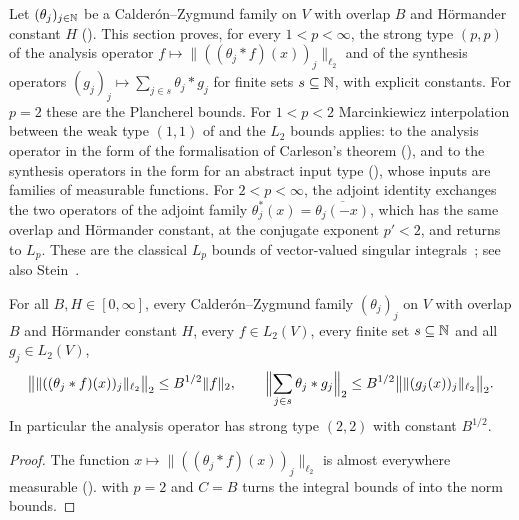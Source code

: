 Let $(\theta_j)_{j \in \mathbb{N}}$ be a Calder\'on--Zygmund family on $V$ with overlap $B$ and
H\"ormander constant $H$ (). This section proves, for every
$1 < p < \infty$, the strong type $(p, p)$ of the analysis operator
$f \mapsto \|((\theta_j * f)(x))_j\|_{\ell_2}$ and of the synthesis operators
$(g_j)_j \mapsto \sum_{j \in s} \theta_j * g_j$ for finite sets $s \subseteq \mathbb{N}$, with explicit
constants. For $p = 2$ these are the Plancherel bounds. For $1 < p < 2$ Marcinkiewicz
interpolation between the weak type $(1,1)$ of  and the
$L_2$ bounds applies: to the analysis operator in the form of the formalisation of Carleson's
theorem (), and to the synthesis operators in the form
for an abstract input type (), whose inputs are families of
measurable functions. For $2 < p < \infty$, the adjoint identity exchanges the two operators of
the adjoint family $\theta_j^*(x) = \overline{\theta_j(-x)}$, which has the same overlap and
H\"ormander constant, at the conjugate exponent $p' < 2$, and 
returns to $L_p$. These are the classical $L_p$ bounds of vector-valued singular
integrals~\cite{BenedekCalderonPanzone}; see also Stein~\cite{SteinSingular}.

\begin{theorem}
\label{thm:cz-strong-type-two}
\leanok
{}
For all $B, H \in [0, \infty]$, every Calder\'on--Zygmund family $(\theta_j)_j$ on $V$ with
overlap $B$ and H\"ormander constant $H$, every $f \in L_2(V)$, every finite set
$s \subseteq \mathbb{N}$ and all $g_j \in L_2(V)$,
\[
  \bigl\| \|((\theta_j * f)(x))_j\|_{\ell_2} \bigr\|_2 \leq B^{1/2} \|f\|_2 , \qquad
  \Bigl\| \sum_{j \in s} \theta_j * g_j \Bigr\|_2
  \leq B^{1/2} \bigl\| \|(g_j(x))_j\|_{\ell_2} \bigr\|_2 .
\]
In particular the analysis operator has strong type $(2, 2)$ with constant $B^{1/2}$.
\end{theorem}

\begin{proof}
\leanok
The function $x \mapsto \|((\theta_j * f)(x))_j\|_{\ell_2}$ is almost everywhere measurable
().  with $p = 2$ and
$C = B$ turns the integral bounds of  into the norm bounds.
\end{proof}

